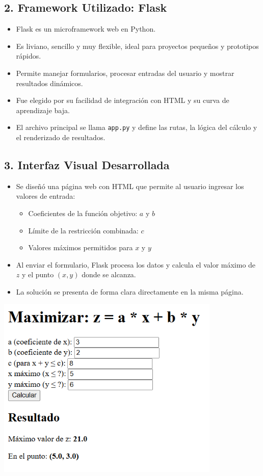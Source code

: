 \documentclass[a4paper,10pt]{article}
\begin{document}
\subsection*{2. Framework Utilizado: Flask}
\begin{itemize}
  \item Flask es un microframework web en Python.
  \item Es liviano, sencillo y muy flexible, ideal para proyectos peque\~nos y prototipos r\'apidos.
  \item Permite manejar formularios, procesar entradas del usuario y mostrar resultados din\'amicos.
  \item Fue elegido por su facilidad de integraci\'on con HTML y su curva de aprendizaje baja.
  \item El archivo principal se llama \texttt{app.py} y define las rutas, la l\'ogica del c\'alculo y el renderizado de resultados.
\end{itemize}

\subsection*{3. Interfaz Visual Desarrollada}
\begin{itemize}
  \item Se dise\~n\'o una p\'agina web con HTML que permite al usuario ingresar los valores de entrada:
  \begin{itemize}
    \item Coeficientes de la funci\'on objetivo: $a$ y $b$
    \item L\'imite de la restricci\'on combinada: $c$
    \item Valores m\'aximos permitidos para $x$ y $y$
  \end{itemize}
  \item Al enviar el formulario, Flask procesa los datos y calcula el valor m\'aximo de $z$ y el punto $(x, y)$ donde se alcanza.
  \item La soluci\'on se presenta de forma clara directamente en la misma p\'agina.
\end{itemize}

\begin{center}
\includegraphics[width=0.8\textwidth]{ejemplo_interfaz.png}
\end{center}
\end{document}
